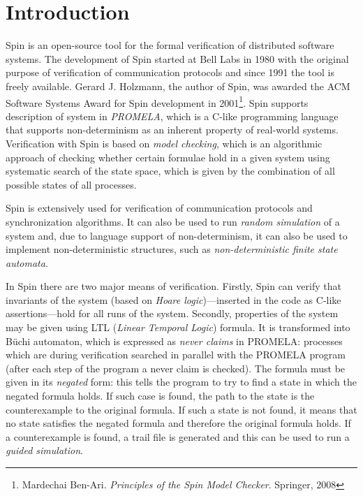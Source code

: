 
\section*{Introduction}
\label{sec:introduction}

Spin is an open-source tool for the formal verification of distributed software systems. The development of Spin started at Bell Labs in 1980 with the original purpose of verification of communication protocols and since 1991 the tool is freely available. Gerard J. Holzmann, the author of Spin, was awarded the ACM Software Systems Award for Spin development in 2001\footnote{Mardechai Ben-Ari. \textit{Principles of the Spin Model Checker}. Springer, 2008}. Spin supports description of system in \emph{PROMELA}, which is a C-like programming language that supports non-determinism as an inherent property of real-world systems. Verification with Spin is based on \emph{model checking}, which is an algorithmic approach of checking whether certain formulae hold in a given system using systematic search of the state space, which is given by the combination of all possible states of all processes.

Spin is extensively used for verification of communication protocols and synchronization algorithms. It can also be used to run \emph{random simulation} of a system and, due to language support of non-determinism, it can also be used to implement non-deterministic structures, such as \emph{non-deterministic finite state automata}.

In Spin there are two major means of verification. Firstly, Spin can verify that invariants of the system (based on \emph{Hoare logic})---inserted in the code as C-like assertions---hold for all runs of the system. Secondly, properties of the system may be given using LTL (\emph{Linear Temporal Logic}) formula. It is transformed into B\"{u}chi automaton, which is expressed as \emph{never claims} in PROMELA: processes which are during verification searched in parallel with the PROMELA program (after each step of the program a never claim is checked). The formula must be given in its \emph{negated} form: this tells the program to try to find a state in which the negated formula holds. If such case is found, the path to the state is the counterexample to the original formula. If such a state is not found, it means that no state satisfies the negated formula and therefore the original formula holds. If a counterexample is found, a trail file is generated and this can be used to run a \emph{guided simulation}.

